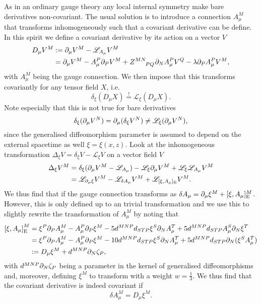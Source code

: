 As in an ordinary gauge theory any local internal symmetry make bare derivatives non-covariant. The usual solution is to introduce a connection $A_\mu^M$ that transforms inhomogeneously such that a covariant derivative can be define. In this spirit we define a covariant derivative by its action on a vector $V$ 
\begin{equation}
    \begin{aligned}
        D_\mu V^M &:= \pd_\mu V^M -\mathscr{L}_{A_\mu}V^M\\
             &= \pd_\mu V^M-A_\mu^P\pd_PV^M+\tensor{Z}{^{MN}_{PQ}}\pd_NA_\mu^PV^Q-\lambda\pd_P A_\mu^PV^M,
    \end{aligned}
\end{equation}
with $A_\mu^M$ being the gauge connection. We then impose that this transforms covariantly for any tensor field $X$, i.e.\
\begin{equation}
    \delta_\xi (D_\mu X) \overset{!}{=} \mathscr{L}_\xi (D_\mu X).
\end{equation}
Note especially that this is not true for bare derivatives
\begin{equation}
    \delta_\xi (\partial_\mu V^N) = \partial_\mu(\delta_\xi V^N) \neq \mathscr{L}_\xi (\partial_\mu V^N),
\end{equation}
since the generalised diffeomorphism parameter is assumed to depend on the external spacetime as well $\xi=\xi(x,z)$. Look at the inhomogeneous transformation $\Delta_\xi V = \delta_\xi V -\mathscr{L}_\xi V$ on a vector field $V$
\begin{equation}
    \begin{aligned}
        \Delta_\xi V^M &= \delta_\xi(\partial_\mu V^M-\mathscr{L}_{A_\mu})-\mathscr{L}_\xi\partial_\mu V^M+\mathscr{L}_\xi\mathscr{L}_{A_\mu}V^M\\
        &=\mathscr{L}_{\partial_\mu\xi}V^M-\mathscr{L}_{\delta A_\mu}V^M+\mathscr{L}_{[\xi,A_\mu]_{\text{E}}}V^M.
    \end{aligned}
\end{equation}
We thus find that if the gauge connection transforms as $\delta A_\mu = \partial_\mu \xi^M+[\xi,A_\mu]_{\text{E}}^M$. However, this is only defined up to an trivial transformation and we use this to slightly rewrite the transformation of $A_\mu^M$ by noting that 
\begin{equation}
    \begin{aligned}
    \left[\xi,A_\mu\right]_{\text{E}}^M &= \xi^P\partial_PA^M_\mu-A_\mu^P\partial_P\xi^M-5d^{MNP}d_{STP}\xi^S\partial_NA_\mu^T+5d^{MNP}d_{STP}A_\mu^S\partial_N\xi^T \\
    &= \xi^P\partial_PA^M_\mu-A_\mu^P\partial_P\xi^M-10d^{MNP}d_{STP}\xi^S\partial_NA_\mu^T+5d^{MNP}d_{STP}\partial_N (\xi^SA_\mu^T)\\
    &:=D_\mu \xi^M+d^{MNP}\partial_N\zeta_P,
    \end{aligned}
\end{equation}
with $d^{MNP}\partial_N\zeta_P$ being a parameter in the kernel of generalised diffeomorphisms and, moreover, defining $\xi^M$ to transform with a weight $w=\frac{1}{3}$. We thus find that the covariant derivative is indeed covariant if 
\begin{equation}
    \delta A_\mu^M = D_\mu \xi^M. 
\end{equation}

